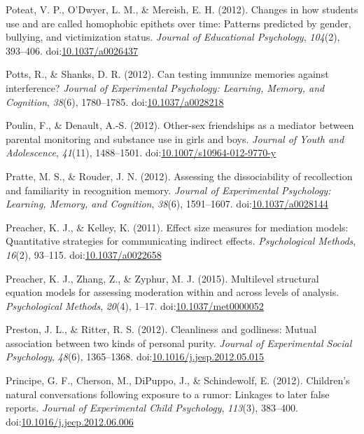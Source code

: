 \documentclass[english,man]{apa6}
\theoremstyle{definition}
\theoremstyle{definition}
\theoremstyle{definition}
\theoremstyle{remark}
\begin{document}
\hypertarget{ref-Poteat2012}{}
Poteat, V. P., O'Dwyer, L. M., \& Mereish, E. H. (2012). Changes in how
students use and are called homophobic epithets over time: Patterns
predicted by gender, bullying, and victimization status. \emph{Journal
of Educational Psychology}, \emph{104}(2), 393--406.
doi:\href{https://doi.org/10.1037/a0026437}{10.1037/a0026437}

\hypertarget{ref-Potts2012}{}
Potts, R., \& Shanks, D. R. (2012). Can testing immunize memories
against interference? \emph{Journal of Experimental Psychology:
Learning, Memory, and Cognition}, \emph{38}(6), 1780--1785.
doi:\href{https://doi.org/10.1037/a0028218}{10.1037/a0028218}

\hypertarget{ref-Poulin2012}{}
Poulin, F., \& Denault, A.-S. (2012). Other-sex friendships as a
mediator between parental monitoring and substance use in girls and
boys. \emph{Journal of Youth and Adolescence}, \emph{41}(11),
1488--1501.
doi:\href{https://doi.org/10.1007/s10964-012-9770-y}{10.1007/s10964-012-9770-y}

\hypertarget{ref-Pratte2012}{}
Pratte, M. S., \& Rouder, J. N. (2012). Assessing the dissociability of
recollection and familiarity in recognition memory. \emph{Journal of
Experimental Psychology: Learning, Memory, and Cognition}, \emph{38}(6),
1591--1607.
doi:\href{https://doi.org/10.1037/a0028144}{10.1037/a0028144}

\hypertarget{ref-Preacher2011}{}
Preacher, K. J., \& Kelley, K. (2011). Effect size measures for
mediation models: Quantitative strategies for communicating indirect
effects. \emph{Psychological Methods}, \emph{16}(2), 93--115.
doi:\href{https://doi.org/10.1037/a0022658}{10.1037/a0022658}

\hypertarget{ref-Preacher2015}{}
Preacher, K. J., Zhang, Z., \& Zyphur, M. J. (2015). Multilevel
structural equation models for assessing moderation within and across
levels of analysis. \emph{Psychological Methods}, \emph{20}(4), 1--17.
doi:\href{https://doi.org/10.1037/met0000052}{10.1037/met0000052}

\hypertarget{ref-Preston2012}{}
Preston, J. L., \& Ritter, R. S. (2012). Cleanliness and godliness:
Mutual association between two kinds of personal purity. \emph{Journal
of Experimental Social Psychology}, \emph{48}(6), 1365--1368.
doi:\href{https://doi.org/10.1016/j.jesp.2012.05.015}{10.1016/j.jesp.2012.05.015}

\hypertarget{ref-Principe2012}{}
Principe, G. F., Cherson, M., DiPuppo, J., \& Schindewolf, E. (2012).
Children's natural conversations following exposure to a rumor: Linkages
to later false reports. \emph{Journal of Experimental Child Psychology},
\emph{113}(3), 383--400.
doi:\href{https://doi.org/10.1016/j.jecp.2012.06.006}{10.1016/j.jecp.2012.06.006}
\end{document}
